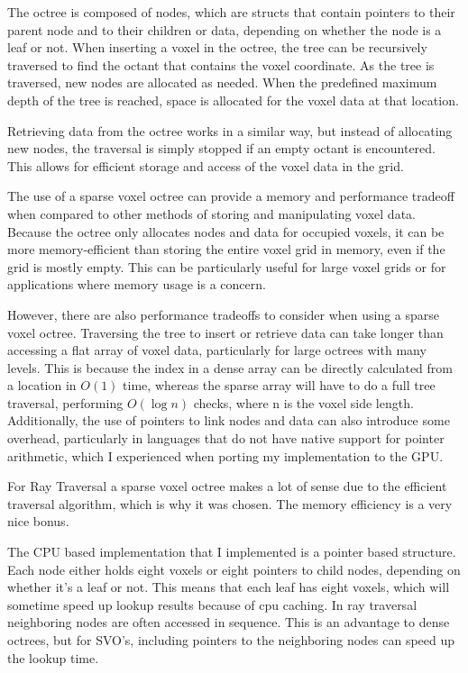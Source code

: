 The octree is composed of nodes, which are structs that contain pointers to their parent node and to their children or data, depending on whether the node is a leaf or not. When inserting a voxel in the octree, the tree can be recursively traversed to find the octant that contains the voxel coordinate. As the tree is traversed, new nodes are allocated as needed. When the predefined maximum depth of the tree is reached, space is allocated for the voxel data at that location.

Retrieving data from the octree works in a similar way, but instead of allocating new nodes, the traversal is simply stopped if an empty octant is encountered. This allows for efficient storage and access of the voxel data in the grid.

The use of a sparse voxel octree can provide a memory and performance tradeoff when compared to other methods of storing and manipulating voxel data. Because the octree only allocates nodes and data for occupied voxels, it can be more memory-efficient than storing the entire voxel grid in memory, even if the grid is mostly empty. This can be particularly useful for large voxel grids or for applications where memory usage is a concern.

However, there are also performance tradeoffs to consider when using a sparse voxel octree. Traversing the tree to insert or retrieve data can take longer than accessing a flat array of voxel data, particularly for large octrees with many levels. This is because the index in a dense array can be directly calculated from a location in $O(1)$ time, whereas the sparse array will have to do a full tree traversal, performing $O(\log n)$ checks, where n is the voxel side length. Additionally, the use of pointers to link nodes and data can also introduce some overhead, particularly in languages that do not have native support for pointer arithmetic, which I experienced when porting my implementation to the GPU.

For Ray Traversal a sparse voxel octree makes a lot of sense due to the efficient traversal algorithm, which is why it was chosen. The memory efficiency is a very nice bonus.

The CPU based implementation that I implemented is a pointer based structure. Each node either holds eight voxels or eight pointers to child nodes, depending on whether it's a leaf or not. This means that each leaf has eight voxels, which will sometime speed up lookup results because of cpu caching. In ray traversal neighboring nodes are often accessed in sequence. This is an advantage to dense octrees, but for SVO's, including pointers to the neighboring nodes can speed up the lookup time.

